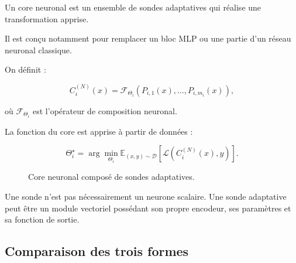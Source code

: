 \documentclass[11pt,a4paper]{article}
\begin{document}
Un core neuronal est un ensemble de sondes adaptatives qui réalise
une transformation apprise.

Il est conçu notamment pour remplacer un bloc MLP ou une partie
d'un réseau neuronal classique.

On définit :

\[
C_i^{(N)}(x)
=
\mathcal{F}_{\Theta_i}
\left(
P_{i,1}(x),\ldots,P_{i,m_i}(x)
\right),
\]

où $\mathcal{F}_{\Theta_i}$ est l'opérateur de composition neuronal.

La fonction du core est apprise à partir de données :

\[
\Theta_i^\star
=
\arg\min_{\Theta_i}
\mathbb{E}_{(x,y)\sim\mathcal{D}}
\left[
\mathcal{L}
\left(
C_i^{(N)}(x),y
\right)
\right].
\]

\begin{figure}[H]
\centering
{}
\caption{Core neuronal composé de sondes adaptatives.}
\end{figure}

Une sonde n'est pas nécessairement un neurone scalaire. Une sonde
adaptative peut être un module vectoriel possédant son propre encodeur,
ses paramètres et sa fonction de sortie.

\subsection{Comparaison des trois formes}
\end{document}
